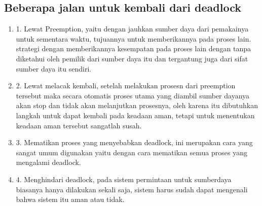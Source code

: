 \subsection {Beberapa jalan untuk kembali dari deadlock}
\begin {enumerate}
\item
1. Lewat Preemption, yaitu dengan jauhkan sumber daya dari pemakainya untuk sementara waktu, tujuannya untuk memberikannya pada proses lain. strategi dengan memberikannya kesempatan pada proses lain dengan tanpa diketahui oleh pemilik dari sumber daya itu dan tergantung juga dari sifat sumber daya itu sendiri.
\item
2. Lewat melacak kembali, setelah melakukan prosesn dari preemption tersebut maka secara otomatis proses utama yang diambil sumber dayanya akan stop dan tidak akan melanjutkan prosesnya, oleh karena itu dibutuhkan langkah untuk dapat kembali pada keadaan aman, tetapi untuk menentukan keadaan aman tersebut sangatlah susah.
\item
3. Mematikan proses yang menyebabkan deadlock, ini merupakan cara yang sangat umum digunakan yaitu dengan cara mematikan semua proses yang mengalami deadlock.
\item
4. Menghindari deadlock, pada sistem permintaan untuk sumberdaya biasanya hanya dilakukan sekali saja, sistem harus sudah dapat mengenali bahwa sistem itu aman atau tidak.
\end {enumerate}

\cite{siahaan2015penyelarasan}
\cite{fauzi2013perangkat}
\cite{silberschatz2014operating}